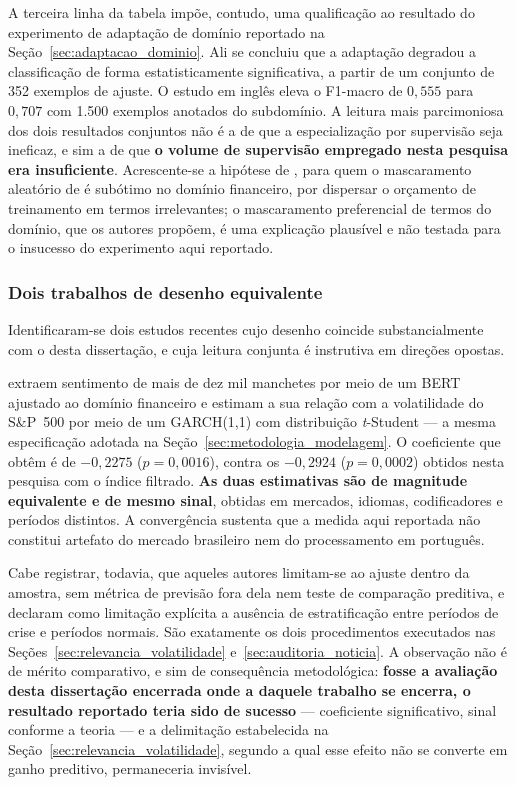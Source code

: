 A terceira linha da tabela impõe, contudo, uma qualificação ao resultado do experimento de adaptação
de domínio reportado na Seção~\ref{sec:adaptacao_dominio}. Ali se concluiu que a adaptação degradou
a classificação de forma estatisticamente significativa, a partir de um conjunto de 352 exemplos de
ajuste. O estudo em inglês eleva o F1-macro de $0{,}555$ para $0{,}707$ com 1.500 exemplos anotados
do subdomínio. A leitura mais parcimoniosa dos dois resultados conjuntos não é a de que a
especialização por supervisão seja ineficaz, e sim a de que \textbf{o volume de supervisão empregado
nesta pesquisa era insuficiente}. Acrescente-se a hipótese de , para
quem o mascaramento aleatório de  é subótimo no domínio financeiro,
por dispersar o orçamento de treinamento em termos irrelevantes; o mascaramento preferencial de
termos do domínio, que os autores propõem, é uma explicação plausível e não testada para o
insucesso do experimento aqui reportado.

\subsubsection{Dois trabalhos de desenho equivalente}

Identificaram-se dois estudos recentes cujo desenho coincide substancialmente com o desta
dissertação, e cuja leitura conjunta é instrutiva em direções opostas.

 extraem sentimento de mais de dez mil manchetes por meio de um
BERT ajustado ao domínio financeiro e estimam a sua relação com a volatilidade do S\&P~500 por meio
de um GARCH(1,1) com distribuição \textit{t}-Student --- a mesma especificação adotada na
Seção~\ref{sec:metodologia_modelagem}. O coeficiente que obtêm é de $-0{,}2275$ ($p = 0{,}0016$),
contra os $-0{,}2924$ ($p = 0{,}0002$) obtidos nesta pesquisa com o índice filtrado. \textbf{As duas
estimativas são de magnitude equivalente e de mesmo sinal}, obtidas em mercados, idiomas,
codificadores e períodos distintos. A convergência sustenta que a medida aqui reportada não
constitui artefato do mercado brasileiro nem do processamento em português.

Cabe registrar, todavia, que aqueles autores limitam-se ao ajuste dentro da amostra, sem métrica de
previsão fora dela nem teste de comparação preditiva, e declaram como limitação explícita a ausência
de estratificação entre períodos de crise e períodos normais. São exatamente os dois procedimentos
executados nas Seções~\ref{sec:relevancia_volatilidade} e~\ref{sec:auditoria_noticia}. A observação
não é de mérito comparativo, e sim de consequência metodológica: \textbf{fosse a avaliação desta
dissertação encerrada onde a daquele trabalho se encerra, o resultado reportado teria sido de
sucesso} --- coeficiente significativo, sinal conforme a teoria --- e a delimitação estabelecida na
Seção~\ref{sec:relevancia_volatilidade}, segundo a qual esse efeito não se converte em ganho
preditivo, permaneceria invisível.

